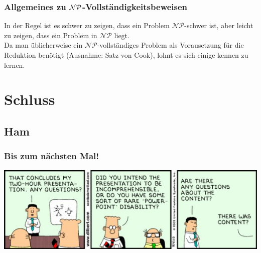
\begin{frame}
\frametitle{Allgemeines zu $\mathcal{NP}$-Vollständigkeitsbeweisen}
In der Regel ist es schwer zu zeigen, dass ein Problem $\mathcal{NP}$-schwer ist, aber leicht zu zeigen, dass ein Problem in $\mathcal{NP}$ liegt.\\[8pt]
Da man üblicherweise ein $\mathcal{NP}$-vollständiges Problem als Vorausetzung für die Reduktion benötigt (Ausnahme: Satz von Cook), lohnt es sich einige kennen zu lernen.
\end{frame}

\section{Schluss}
\subsection{Ham}

\begin{frame}
	\frametitle{Bis zum nächsten Mal!}
	
	\begin{center}
		\includegraphics[width=\textwidth]{images/221_strip.jpg}
	\end{center}
\end{frame}


